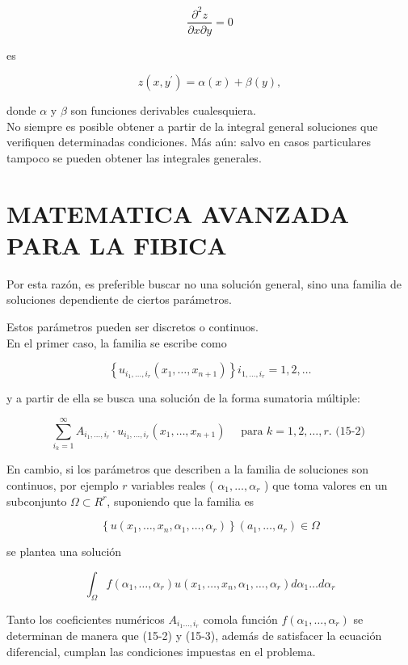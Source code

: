 \documentclass[10pt]{article}
\theoremstyle{plain}
\theoremstyle{definition}
\theoremstyle{remark}
\begin{document}
$$
\frac{\partial^{2} z}{\partial x \partial y}=0
$$

es

$$
z\left(x, y^{\prime}\right)=\alpha(x)+\beta(y),
$$

donde $\alpha$ y $\beta$ son funciones derivables cualesquiera.\\
No siempre es posible obtener a partir de la integral general soluciones que verifiquen determinadas condiciones. Más aún: salvo en casos particulares tampoco se pueden obtener las integrales generales.

\section*{MATEMATICA AVANZADA PARA LA FIBICA}
Por esta razón, es preferible buscar no una solución general, sino una familia de soluciones dependiente de ciertos parámetros.

Estos parámetros pueden ser discretos o continuos.\\
En el primer caso, la familia se escribe como

$$
\left\{u_{i_{1}, \ldots, i_{r}}\left(x_{1}, \ldots, x_{n+1}\right)\right\} i_{1, \ldots, i_{r}}=1,2, \ldots
$$

y a partir de ella se busca una solución de la forma sumatoria múltiple:

$$
\sum_{i_{k}=1}^{\infty} A_{i_{1}, \ldots, i_{r}} \cdot u_{i_{1}, \ldots, i_{r}}\left(x_{1}, \ldots, x_{n+1}\right) \quad \text { para } k=1,2, \ldots, r . \text { (15-2) }
$$

En cambio, si los parámetros que describen a la familia de soluciones son continuos, por ejemplo $r$ variables reales ( $\alpha_{1}, \ldots, \alpha_{r}$ ) que toma valores en un subconjunto $\Omega \subset R^{r}$, suponiendo que la familia es

$$
\left\{u\left(x_{1}, \ldots, x_{n}, \alpha_{1}, \ldots, \alpha_{r}\right)\right\}\left(a_{1}, \ldots, a_{r}\right) \in \Omega
$$

se plantea una solución


\begin{equation*}
\int_{\Omega} f\left(\alpha_{1}, \ldots, \alpha_{r}\right) u\left(x_{1}, \ldots, x_{n}, \alpha_{1}, \ldots, \alpha_{r}\right) d \alpha_{1} \ldots d \alpha_{r} \tag{15-3}
\end{equation*}


Tanto los coeficientes numéricos $A_{i_{1} \ldots, i_{r}}$ comola función $f\left(\alpha_{1}, \ldots, \alpha_{r}\right)$ se determinan de manera que (15-2) y (15-3), además de satisfacer la ecuación diferencial, cumplan las condiciones impuestas en el problema.
\end{document}
